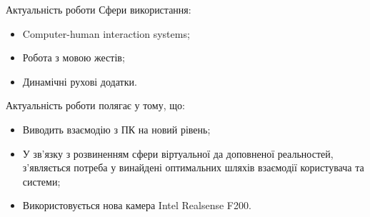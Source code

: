 \begin{frame}{Актуальність роботи}
	\manimate	
	Сфери використання:
	\begin{itemize}%
		\item Computer-human interaction systems;
		\item Робота з мовою жестів;
		\item Динамічні рухові додатки.
	\end{itemize}
	Актуальність роботи полягає у тому, що:
	\begin{itemize}
		\item Виводить взаємодію з ПК на новий рівень;
		\item У зв'язку з розвиненням сфери віртуальної да доповненої реальностей, з'являється потреба у винайдені оптимальних шляхів взаємодії користувача та системи;
		\item Використовується нова камера Intel Realsense F200.
	\end{itemize}
\end{frame}